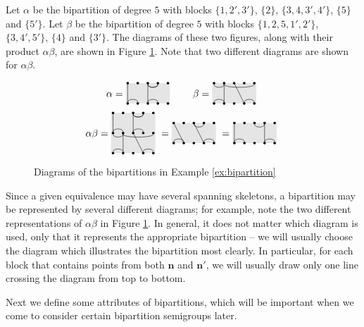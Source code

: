 \begin{example}
  \label{ex:bipartition}
  Let $\alpha$ be the bipartition of degree $5$ with blocks $\{1, 2', 3'\}$,
  $\{2\}$, $\{3, 4, 3', 4'\}$, $\{5\}$ and $\{5'\}$.  Let $\beta$ be the
  bipartition of degree $5$ with blocks $\{1, 2, 5, 1', 2'\}$, $\{3, 4', 5'\}$,
  $\{4\}$ and $\{3'\}$.  The diagrams of these two figures, along with their
  product $\alpha \beta$, are shown in Figure \ref{fig:bipartition-example}.
  Note that two different diagrams are shown for $\alpha \beta$.
  \begin{figure}[ht]
    \centering
    $$\alpha = \bipartdiag{\tv11\bc12 \tc34 \tv33\tc34\bc34} \qquad
    \beta = \bipartdiag{\tc12\tc25\tv22\bc12 \tv34\bc45}$$
    $$\alpha \beta = \doublebipartdiag{\utv11\ubc12 \utc34 \utv33\utc34\ubc34
      \tc12\tc25\tv22\bc12 \tv34\bc45}
    = \bipartdiag{\tv12\bc12 \tc34\tv34\bc45}
    = \bipartdiag{\tv11\bc12 \tc34\tv44\bc45}$$
    \caption{Diagrams of the bipartitions in Example \ref{ex:bipartition}}
    \label{fig:bipartition-example}
  \end{figure}
\end{example}

Since a given equivalence may have several spanning skeletons, a bipartition may
be represented by several different diagrams; for example, note the two
different representations of $\alpha \beta$ in Figure
\ref{fig:bipartition-example}.  In general, it does not matter which diagram is
used, only that it represents the appropriate bipartition -- we will usually
choose the diagram which illustrates the bipartition most clearly.  In
particular, for each block that contains points from both $\mathbf{n}$ and
$\mathbf{n}'$, we will usually draw only one line crossing the diagram from top
to bottom.

Next we define some attributes of bipartitions, which will be important when we
come to consider certain bipartition semigroups later.

